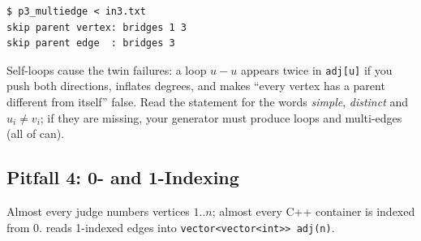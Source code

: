 \begin{diagrambox}
\end{diagrambox}

\begin{lstlisting}[style=trace]
$ p3_multiedge < in3.txt
skip parent vertex: bridges 1 3
skip parent edge  : bridges 3
\end{lstlisting}

Self-loops cause the twin failures: a loop $u{-}u$ appears twice in \texttt{adj[u]} if you push both directions, inflates degrees, and makes ``every vertex has a parent different from itself'' false. Read the statement for the words \emph{simple}, \emph{distinct} and $u_i \ne v_i$; if they are missing, your generator must produce loops and multi-edges (all of  can).

\subsection{Pitfall 4: 0- and 1-Indexing}
\label{ssec:ts-p4}

Almost every judge numbers vertices $1..n$; almost every C++ container is indexed from 0.  reads 1-indexed edges into \texttt{vector<vector<int>> adj(n)}.

